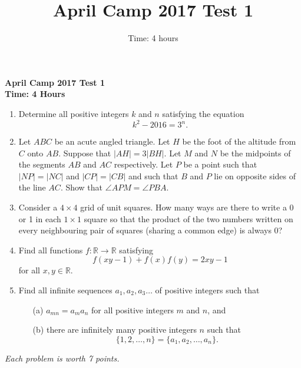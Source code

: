 \documentclass[a4paper,12pt, titlepage]{article}
\title{April Camp 2017 Test 1}
\date{}
\author{Time: 4 hours}
\begin{document}
\begin{center}
	\Large{\textbf{April Camp 2017 Test 1}}\\
	\large{\textbf{Time: 4 Hours}}\\	
\end{center}


\begin{enumerate}
	\item 
	Determine all positive integers $k$ and $n$ satisfying the equation $$k^2 - 2016 = 3^n.$$
	
		
	\item 
	Let $ABC$ be an acute angled triangle. Let $H$ be the foot of the altitude from $C$ onto $AB$. Suppose that $|AH|=3|BH|$. Let $M$ and $N$ be the midpoints of the segments $AB$ and $AC$ respectively. Let $P$ be a point such that $|NP|=|NC|$ and $|CP|=|CB|$ and such that $B$ and $P$ lie on opposite sides of the line $AC$. Show that $\angle APM = \angle PBA$.\\
	
	\item 
	
	Consider a $4 \times 4$ grid of unit squares. How many ways are there to write a 0 or 1 in each $1 \times 1$ square so that the product of the two numbers written on every neighbouring pair of squares (sharing a common edge) is always 0?\\	
	\smallskip
	
	\item 
	
	Find all functions $f:\mathbb{R} \rightarrow \mathbb{R}$ satisfying $$f(xy-1)+f(x)f(y) = 2xy - 1$$ for all $x,y \in \mathbb{R}$.\\
	
	
	\item
	
	Find all infinite sequences $a_1, a_2, a_3 \dots $ of positive integers such that
	\begin{itemize}
	\item [(a)] $a_{mn} = a_ma_n$ for all positive integers $m$ and $n$, and
	\item [(b)] there are infinitely many positive integers $n$ such that $$\{1, 2, \dots, n\} = \{a_1, a_2, \dots, a_n \}.$$
	\end{itemize}
\end{enumerate}

\medskip 

\hfill \emph{Each problem is worth 7 points.}
	
\end{document}
